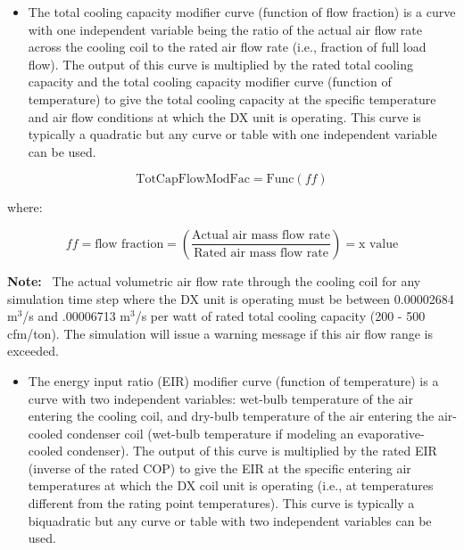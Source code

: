 \begin{itemize}
\tightlist
\item
 The total cooling capacity modifier curve (function of flow fraction) is a curve with one independent variable being the ratio of the actual air flow rate across the cooling coil to the rated air flow rate (i.e., fraction of full load flow). The output of this curve is multiplied by the rated total cooling capacity and the total cooling capacity modifier curve (function of temperature) to give the total cooling capacity at the specific temperature and air flow conditions at which the DX unit is operating. This curve is typically a quadratic but any curve or table with one independent variable can be used.
\end{itemize}

\begin{equation}
\text{TotCapFlowModFac} = \text{Func}\left(ff\right)
\end{equation}

where:

\begin{equation}
ff = \text{flow fraction} = \left( \frac{\text{Actual air mass flow rate}}{\text{Rated air mass flow rate}} \right) = \text{x value}
\end{equation}

\textbf{Note:}~ The actual volumetric air flow rate through the cooling coil for any simulation time step where the DX unit is operating must be between 0.00002684 m\(^{3}\)/s and .00006713 m\(^{3}\)/s per watt of rated total cooling capacity (200 - 500 cfm/ton). The simulation will issue a warning message if this air flow range is exceeded.

\begin{itemize}
\tightlist
\item
  The energy input ratio (EIR) modifier curve (function of temperature) is a curve with two independent variables: wet-bulb temperature of the air entering the cooling coil, and dry-bulb temperature of the air entering the air-cooled condenser coil (wet-bulb temperature if modeling an evaporative-cooled condenser). The output of this curve is multiplied by the rated EIR (inverse of the rated COP) to give the EIR at the specific entering air temperatures at which the DX coil unit is operating (i.e., at temperatures different from the rating point temperatures). This curve is typically a biquadratic but any curve or table with two independent variables can be used.
\end{itemize}

